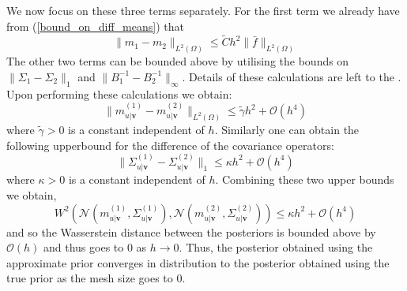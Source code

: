We now focus on these three terms separately. For the first term we already have from (\ref{bound_on_diff_means}) that
\begin{equation*}
    \|m_{1}-m_{2}\|_{L^{2}(\Omega)}\leq\tilde{C}h^{2}\|\bar{f}\|_{L^2(\Omega)}
\end{equation*}
The other two terms can be bounded above by utilising the bounds on $\|\Sigma_1-\Sigma_{2}\|_{1}$ and $\|B_{1}^{-1}-B_{2}^{-1}\|_{\infty}$. Details of these calculations are left to the \textcolor{blue}{}. Upon performing these calculations we obtain:
\begin{equation}
    \|m^{(1)}_{u|\mathbf{v}}-m^{(2)}_{u|\mathbf{v}}\|_{L^{2}(\Omega)}\leq\tilde{\gamma}h^{2}+\mathcal{O}(h^4)
\end{equation}
where $\tilde{\gamma}>0$ is a constant independent of $h$. Similarly one can obtain the following upperbound for the difference of the covariance operators:
\begin{equation}
    \|\Sigma^{(1)}_{u|\mathbf{v}}-\Sigma^{(2)}_{u|\mathbf{v}}\|_{1}\leq \kappa h^{2}+\mathcal{O}(h^4)
\end{equation}
where $\kappa>0$ is a constant independent of $h$. Combining these two upper bounds we obtain,
\begin{equation}
    W^{2}\left(\mathcal{N}(m^{(1)}_{u|\mathbf{v}},\Sigma^{(1)}_{u|\mathbf{v}}),\mathcal{N}(m^{(2)}_{u|\mathbf{v}},\Sigma^{(2)}_{u|\mathbf{v}})\right)\leq\kappa h^{2} + \mathcal{O}(h^4)
\end{equation}
and so the Wasserstein distance between the posteriors is bounded above by $\mathcal{O}(h)$ and thus goes to $0$ as $h\rightarrow 0$. Thus, the posterior obtained using the approximate prior converges in distribution to the posterior obtained using the true prior as the mesh size goes to 0.
\qedsymbol
